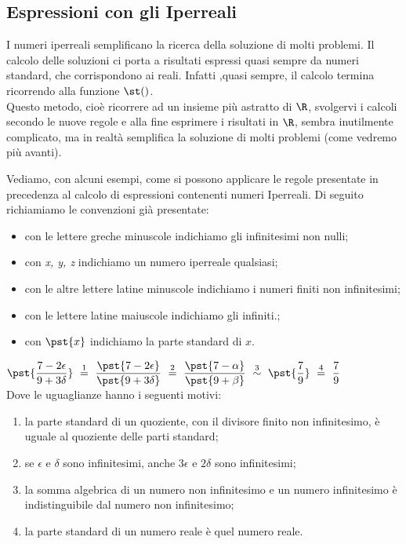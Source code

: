 \subsection{Espressioni con gli Iperreali}
\label{subsec:insnum_espressioni}

I numeri iperreali semplificano la ricerca della soluzione di molti 
problemi.
Il calcolo delle soluzioni ci porta a risultati espressi quasi sempre da 
numeri standard, che corrispondono ai reali. Infatti ,quasi sempre, il 
calcolo termina ricorrendo alla funzione $\st()$.\\
Questo metodo, cioè ricorrere ad un insieme più astratto di \(\R\), 
svolgervi i calcoli secondo le nuove regole e alla fine esprimere i 
risultati in \(\R\), 
sembra inutilmente complicato, 
ma in realtà semplifica la soluzione di molti problemi 
(come vedremo più avanti).

Vediamo, con alcuni esempi, come si possono applicare 
le regole presentate in precedenza al calcolo di espressioni 
contenenti numeri Iperreali. 
Di seguito richiamiamo le convenzioni già presentate:
\begin{itemize} [nosep]
 \item con le lettere greche minuscole indichiamo gli infinitesimi non 
nulli;
 \item con \emph{x, y, z} indichiamo un numero iperreale qualsiasi;
 \item con le altre lettere latine minuscole indichiamo i numeri finiti non 
infinitesimi;
 \item con le lettere latine maiuscole indichiamo gli infiniti.;
 \item con \(\pst{x}\) indichiamo la parte standard di \(x\).
\end{itemize}

\begin{esempio}

\(\pst{\dfrac{7 -2 \epsilon}{9 +3 \delta}} 
~ \stackrel{1}{=} ~
  \dfrac{\pst{7 -2 \epsilon}}{\pst{9 +3 \delta}} 
~ \stackrel{2}{=} ~
  \dfrac{\pst{7 -\alpha}}{\pst{9 +\beta}} 
~ \stackrel{3}{\sim} ~ \pst{\dfrac{7}{9}}
~ \stackrel{4}{=} ~ \dfrac{7}{9}\)\\

Dove le uguaglianze hanno i seguenti motivi:
\begin{enumerate} [nosep]
 \item la parte standard di un quoziente, con il divisore finito non 
infinitesimo, è uguale al quoziente delle parti standard; 
 \item se \(\epsilon \text{ e } \delta\) sono infinitesimi, 
 anche \(3\epsilon\) e \(2 \delta\) sono infinitesimi;
 \item la somma algebrica di un numero non infinitesimo e un numero 
infinitesimo è indistinguibile dal numero non infinitesimo;
 \item la parte standard di un numero reale è quel numero reale.
\end{enumerate}
\end{esempio}

